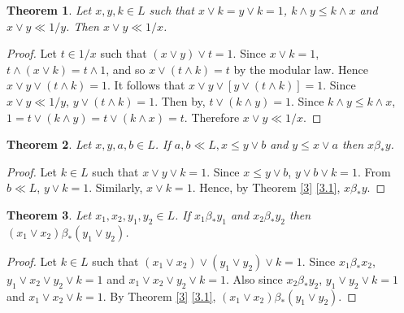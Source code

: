 \documentclass[a4paper,12pt]{article}
\newtheorem{theorem}{Theorem}[section]
\numberwithin{equation}{section}
\begin{document}

\begin{theorem}\label{16}
  Let $ x,y,k \in L $ such that $ x \vee k = y \vee k = 1 $, $ k \wedge y \leq k \wedge x $ and $ x \vee y \ll 1/y $. 
  Then $ x \vee y \ll 1/x $.
\end{theorem}

\begin{proof}
  Let $ t \in 1/x $ such that $ ( x \vee y ) \vee t = 1 $. Since $ x \vee k = 1 $, $ t \wedge ( x \vee k ) = t \wedge 1 $, 
  and so $ x \vee ( t \wedge k ) = t $ by the modular law. Hence $ x \vee y \vee ( t \wedge k ) = 1 $. 
  It follows that $ x \vee y \vee \left[ y \vee ( t \wedge k ) \right] = 1 $. Since $ x \vee y \ll 1/y $, 
  $ y \vee ( t \wedge k ) = 1 $. Then by, $ t \vee ( k \wedge y ) = 1 $. 
  Since $ k \wedge y \leq k \wedge x $, $ 1 = t \vee ( k \wedge y ) = t \vee ( k \wedge x ) =t $. Therefore $ x \vee y \ll 1/x $.
\end{proof}

\begin{theorem}\label{17}
  Let $x,y,a,b \in L $. If $ a,b \ll L, x \leq y \vee b $ and $ y \leq x \vee a $ then $ x \beta_* y $.
\end{theorem}

\begin{proof}
  Let $ k \in L $ such that $ x \vee y \vee k = 1 $. Since $ x \leq y \vee b $, $ y \vee b \vee k = 1 $. 
  From $ b \ll L $, $ y \vee k = 1 $. Similarly, $ x \vee k = 1 $. 
  Hence, by Theorem \ref{3} \ref{3.1}, $ x \beta_* y $.
\end{proof}


\begin{theorem}\label{18}
  Let $ x_1,x_2,y_1,y_2 \in L $. If $ x_1 \beta_* y_1 $ and $ x_2 \beta_* y_2 $ then $ ( x_1 \vee x_2 ) \beta_* ( y_1 \vee y_2 ) $.
\end{theorem}

\begin{proof}
  Let $ k \in L $ such that $ (x_1 \vee x_2 ) \vee (y_1 \vee y_2 ) \vee k = 1 $. Since $ x_1 \beta_* x_2 $, 
  $ y_1 \vee x_2 \vee y_2 \vee k = 1 $ and $ x_1 \vee x_2 \vee y_2 \vee k = 1 $. Also since 
  $ x_2 \beta_* y_2 $, $ y_1 \vee y_2 \vee k = 1 $ and $ x_1 \vee x_2 \vee k = 1 $. 
  By Theorem \ref{3} \ref{3.1}, $ ( x_1 \vee x_2 ) \beta_* ( y_1 \vee y_2 ) $.
\end{proof}
\end{document}
